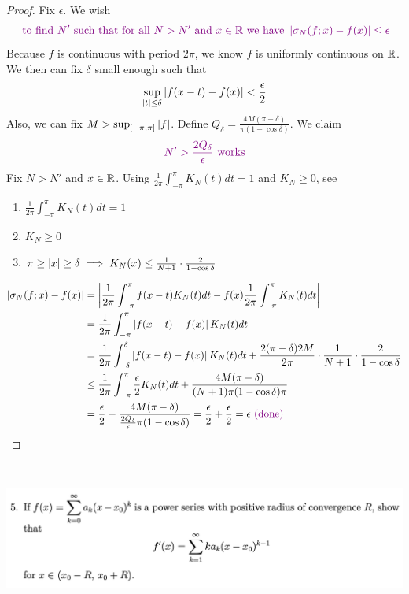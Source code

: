 \documentclass{report}
\begin{document}
\begin{proof}
Fix $\epsilon $. We wish 
\begin{align*}
\textcolor{violet}{\text{ to find $N'$ such that for all $N>N'$ and  $x \in\mathbb{R}$ we have }\left|\sigma_N(f;x)-f(x)\right|\leq \epsilon }
\end{align*}
Because $f$ is continuous with period $2\pi$, we know $f$ is uniformly continuous on $\mathbb{R}$. We then can fix $\delta$ small enough such that 
\begin{align*}
\sup_{\left|t\right|\leq \delta} \left|f(x-t)-f(x)\right|<\frac{\epsilon}{2}
\end{align*}
Also, we can fix $M>\sup_{[-\pi,\pi]}\left|f\right|$. Define $Q_\delta=\frac{4M(\pi-\delta)}{\pi (1-\cos \delta)}$. We claim 
\begin{align*}
\textcolor{violet}{\text{ $N'>\frac{2Q_\delta}{\epsilon }$ works }}
\end{align*}
Fix $N>N'$ and  $x \in\mathbb{R}$. Using $\frac{1}{2\pi}\int_{-\pi}^{\pi}K_N(t)dt=1$ and $K_N\geq 0$, see 
\begin{enumerate}[label=(\alph*)]
  \item $\frac{1}{2\pi}\int_{-\pi}^{\pi}K_N(t)dt=1$ 
  \item $K_N\geq 0$
  \item $\pi \geq \left|x\right|\geq \delta \implies K_N(x)\leq \frac{1}{N+1}\cdot \frac{2}{1-\cos \delta}$
\end{enumerate}
\begin{align*}
\left|\sigma_N(f;x)-f(x)\right|&=\left|\frac{1}{2\pi}\int_{-\pi}^{\pi}f(x-t)K_N(t)dt-f(x)\frac{1}{2\pi}\int_{-\pi}^{\pi}K_N(t)dt\right|\\
&=\frac{1}{2\pi}\int_{-\pi}^{\pi}\left|f(x-t)-f(x)\right|K_N(t)dt\\
&=\frac{1}{2\pi}\int_{-\delta}^{\delta} \left|f(x-t)-f(x)\right|K_N(t)dt+\frac{2(\pi -\delta)2M}{2\pi}\cdot \frac{1}{N+1}\cdot \frac{2}{1-\cos \delta}\\
&\leq \frac{1}{2\pi}\int_{-\pi}^{\pi}\frac{\epsilon }{2}K_N(t)dt+\frac{4M(\pi -\delta)}{(N+1)\pi(1-\cos \delta)\pi}\\
&=\frac{\epsilon}{2}+\frac{4M(\pi-\delta)}{\frac{2Q_\delta}{\epsilon }\pi(1-\cos \delta)}=\frac{\epsilon}{2}+\frac{\epsilon}{2}=\epsilon\textcolor{violet}{\text{ (done) }}
\end{align*}
\end{proof}
\begin{question}{}{}
\includegraphics[height=5cm,width=18cm]{ahw26}
\end{question}
\end{document}
